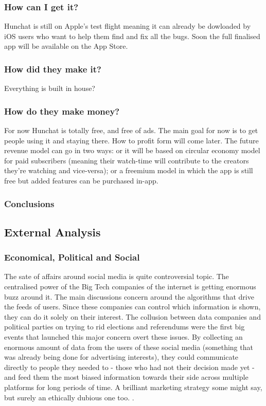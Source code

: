 \documentclass[12pt]{article}
\begin{document}
	\subsubsection{How can I get it?}
Hunchat is still on Apple's test flight meaning it can already be dowloaded by iOS users who want to help them find and fix all the bugs. Soon the full finalised app will be available on the App Store.

	\subsubsection{How did they make it?}
Everything is built in house?

	\subsubsection{How do they make money?}
For now Hunchat is totally free, and free of ads. The main goal for now is to get people using it and staying there. How to profit form will come later. The future revenue model can go in two ways: or it will be based on circular economy model for paid subscribers (meaning their watch-time will contribute to the creators they're watching and vice-versa); or a freemium model in which the app is still free but added features can be purchased in-app.

	\subsubsection{Conclusions}

\subsection{External Analysis}
	
	\subsubsection{Economical, Political and Social}
	The sate of affairs around social media is quite controversial topic. The centralised power of the Big Tech companies of the internet is getting enormous buzz around it. The main discussions concern around the algorithms that drive the feeds of users. Since these companies can control which information is shown, they can do it solely on their interest. The collusion between data companies and political parties on trying to rid elections and referendums were the first big events that launched this major concern overt these issues. By collecting an enormous amount of data from the users of these social media (something that was already being done for advertising interests), they could communicate directly to people they needed to - those who had not their decision made yet - and feed them the most biased information towards their side across multiple platforms for long periods of time. A brilliant marketing strategy some might say, but surely an ethically dubious one too. .
	
\end{document}
